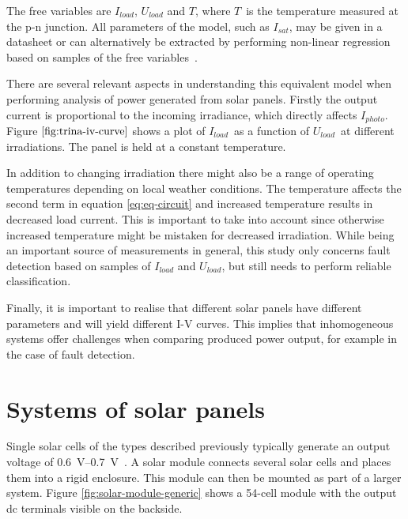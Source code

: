 The free variables are $I_{load}$, $U_{load}$ and $T$, where $T$ is the temperature measured at the p-n junction.
All parameters of the model, such as $I_{sat}$, may be given in a datasheet or can alternatively be extracted by performing non-linear regression based on samples of the free variables~\cite{Walker2001}.

There are several relevant aspects in understanding this equivalent model when performing analysis of power generated from solar panels.
Firstly the output current is proportional to the incoming irradiance, which directly affects $I_{photo}$.
Figure $\ref{fig:trina-iv-curve}$ shows a plot of $I_{load}$ as a function of $U_{load}$ at different irradiations.
The panel is held at a constant temperature.


In addition to changing irradiation there might also be a range of operating temperatures depending on local weather conditions.
The temperature affects the second term in equation \ref{eq:eq-circuit} and increased temperature results in decreased load current.
This is important to take into account since otherwise increased temperature might be mistaken for decreased irradiation.
While being an important source of measurements in general, this study only concerns fault detection based on samples of $I_{load}$ and $U_{load}$, but still needs to perform reliable classification.

Finally, it is important to realise that different solar panels have different parameters and will yield different I-V curves.
This implies that inhomogeneous systems offer challenges when comparing produced power output, for example in the case of fault detection.

\section{Systems of solar panels}
Single solar cells of the types described previously typically generate an output voltage of \SIrange{0.6}{0.7}{\volt}~\cite{Zhao2010thesis}.
A solar module connects several solar cells and places them into a rigid enclosure.
This module can then be mounted as part of a larger system.
Figure \ref{fig:solar-module-generic} shows a 54-cell module with the output dc terminals visible on the backside.

